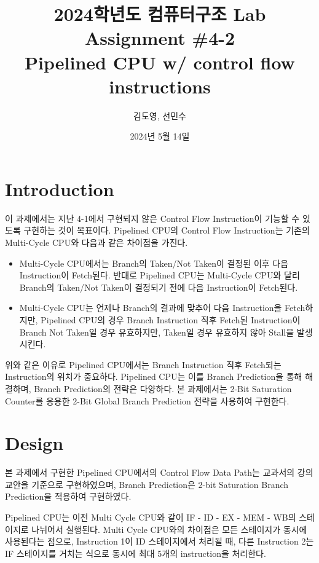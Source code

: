 \documentclass[openright, a4paper]{article}
\title{2024학년도 컴퓨터구조 Lab Assignment \#4-2\\
        Pipelined CPU w/ control flow instructions}
\author{김도영, 선민수}
\date{2024년 5월 14일}
\begin{document}
\maketitle


\section{Introduction}
이 과제에서는 지난 4-1에서 구현되지 않은 Control Flow Instruction이 기능할 수 있도록 구현하는 것이 목표이다.
Pipelined CPU의 Control Flow Instruction는 기존의 Multi-Cycle CPU와 다음과 같은 차이점을 가진다.

\begin{itemize}
    \item Multi-Cycle CPU에서는 Branch의 Taken/Not Taken이 결정된 이후 다음 Instruction이 Fetch된다. 반대로 Pipelined CPU는 Multi-Cycle CPU와 달리 Branch의 Taken/Not Taken이 결정되기 전에 다음 Instruction이 Fetch된다.
    \item Multi-Cycle CPU는 언제나 Branch의 결과에 맞추어 다음 Instruction을 Fetch하지만, Pipelined CPU의 경우 Branch Instruction 직후 Fetch된 Instruction이 Branch Not Taken일 경우 유효하지만, Taken일 경우 유효하지 않아 Stall을 발생시킨다.
\end{itemize}

위와 같은 이유로 Pipelined CPU에서는 Branch Instruction 직후 Fetch되는 Instruction의 위치가 중요하다. Pipelined CPU는 이를 Branch Prediction을 통해 해결하며, Branch Prediction의 전략은 다양하다. 본 과제에서는 2-Bit Saturation Counter를 응용한 2-Bit Global Branch Prediction 전략을 사용하여 구현한다.


\section{Design}
본 과제에서 구현한 Pipelined CPU에서의 Control Flow Data Path는 교과서의 강의 교안을 기준으로 구현하였으며, Branch Prediction은 2-bit Saturation Branch Prediction을 적용하여 구현하였다.

\hfill

Pipelined CPU는 이전 Multi Cycle CPU와 같이 IF - ID - EX - MEM - WB의 스테이지로 나뉘어서 실행된다. Multi Cycle CPU와의 차이점은 모든 스테이지가 동시에 사용된다는 점으로, Instruction 1이 ID 스테이지에서 처리될 때, 다른 Instruction 2는 IF 스테이지를 거치는 식으로 동시에 최대 5개의 instruction을 처리한다.
\end{document}
